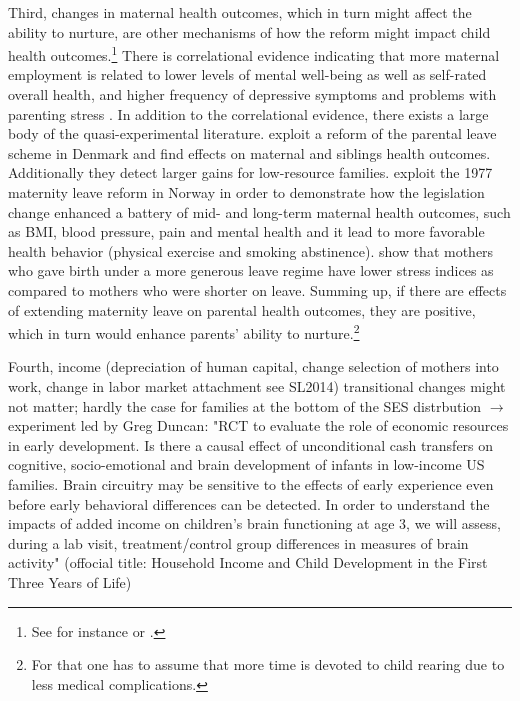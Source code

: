 \documentclass[11pt, a4paper,draft]{article} %
\begin{document}
Third, changes in maternal health outcomes, which in turn might affect the ability to nurture, are other mechanisms of how the reform might impact child health outcomes.\footnote{See for instance \cite{patel2004} or \cite{frech2011maternal}.} There is correlational evidence indicating that more maternal employment is related to lower levels of mental well-being as well as self-rated overall health, and higher frequency of depressive symptoms and problems with parenting stress \citep{chatterji2005does,Chatterji2013}. In addition to the correlational evidence, there exists a large body of the quasi-experimental literature. \cite{beuchert2016} exploit a reform of the parental leave scheme in Denmark and find effects on maternal and siblings health outcomes. Additionally they detect larger gains for low-resource families. \cite{butikofer2018impact} exploit the 1977 maternity leave reform in Norway in order to demonstrate how the legislation change enhanced a battery of mid- and long-term maternal health outcomes, such as BMI, blood pressure, pain and mental health and it lead to more favorable health behavior (physical exercise and smoking abstinence). \cite{albagli2018} show that mothers who gave birth under a more generous leave regime have lower stress indices as compared to mothers who were shorter on leave. \newline 
Summing up, if there are effects of extending maternity leave on parental health outcomes, they are positive, which in turn would enhance parents' ability to nurture.\footnote{ For that one has to assume that more time is devoted to child rearing due to less medical complications.}\newline 



Fourth, 
 income (depreciation of human capital, change selection of mothers into work, change in labor market attachment see SL2014)
transitional changes might not matter; hardly the case for families at the bottom of the SES distrbution $\rightarrow$	 
experiment led by Greg Duncan: "RCT to evaluate the role of economic resources in early development. Is there a causal effect of unconditional cash transfers on cognitive, socio-emotional and brain development of infants in low-income US families. Brain circuitry may be sensitive to the effects of early experience even before early behavioral differences can be detected. In order to understand the impacts of added income on children's brain functioning at age 3, we will assess, during a lab visit, treatment/control group differences in measures of brain activity" (offocial title: Household Income and Child Development in the First Three Years of Life)
\end{document}
